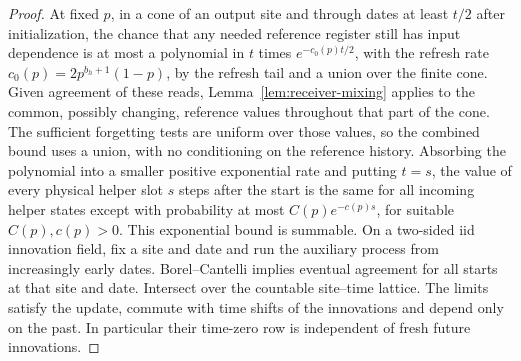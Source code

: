 \begin{proof}
At fixed \(p\), in a cone of an output site and through dates at least \(t/2\) after initialization, the chance that any needed reference register still has input dependence is at most a polynomial in \(t\) times \(e^{-c_0(p)t/2}\), with the refresh rate \(c_0(p)=2p^{b_h+1}(1-p)\), by the refresh tail and a union over the finite cone. Given agreement of these reads, Lemma~\ref{lem:receiver-mixing} applies to the common, possibly changing, reference values throughout that part of the cone. The sufficient forgetting tests are uniform over those values, so the combined bound uses a union, with no conditioning on the reference history. Absorbing the polynomial into a smaller positive exponential rate and putting \(t=s\), the value of every physical helper slot \(s\) steps after the start is the same for all incoming helper states except with probability at most \(C(p)e^{-c(p)s}\), for suitable \(C(p),c(p)>0\). This exponential bound is summable. On a two-sided iid innovation field, fix a site and date and run the auxiliary process from increasingly early dates. Borel--Cantelli implies eventual agreement for all starts at that site and date. Intersect over the countable site--time lattice. The limits satisfy the update, commute with time shifts of the innovations and depend only on the past. In particular their time-zero row is independent of fresh future innovations.
\end{proof}
